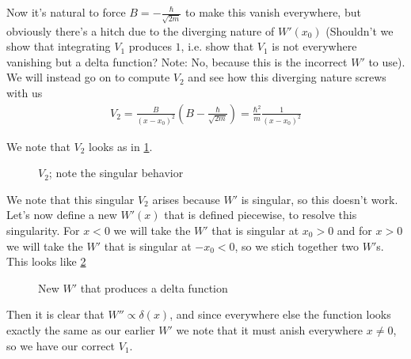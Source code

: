 \documentclass[10pt]{report}
\begin{document}
Now it's natural to force $B = -\frac{\hbar}{\sqrt{2m}}$ to make this vanish everywhere, but obviously there's a hitch due to the diverging nature of $W'(x_0)$ (Shouldn't we show that integrating $V_1$ produces $1$, i.e. show that $V_1$ is not everywhere vanishing but a delta function? Note: No, because this is the incorrect $W'$ to use). We will instead go on to compute $V_2$ and see how this diverging nature screws with us
\begin{align}
    V_2 = \frac{B}{(x-x_0)^2}\left( B - \frac{\hbar}{\sqrt{2m}} \right) = \frac{\hbar^2}{m}\frac{1}{(x-x_0)^2}
\end{align}

We note that $V_2$ looks as in \ref{4.28.V2}.
\begin{figure}[!h]
    \centering
    \caption{$V_2$; note the singular behavior}
    \label{4.28.V2}
\end{figure}

We note that this singular $V_2$ arises because $W'$ is singular, so this doesn't work. Let's now define a new $W'(x)$ that is defined piecewise, to resolve this singularity. For $x < 0$ we will take the $W'$ that is singular at $x_0 > 0$ and for $x > 0$ we will take the $W'$ that is singular at $-x_0 < 0$, so we stich together two $W'$s. This looks like \ref{4.28.newW}
\begin{figure}[!h]
    \centering
    \caption{New $W'$ that produces a delta function}
    \label{4.28.newW}
\end{figure}

Then it is clear that $W'' \propto \delta(x)$, and since everywhere else the function looks exactly the same as our earlier $W'$ we note that it must anish everywhere $x \neq 0$, so we have our correct $V_1$.
\end{document}
